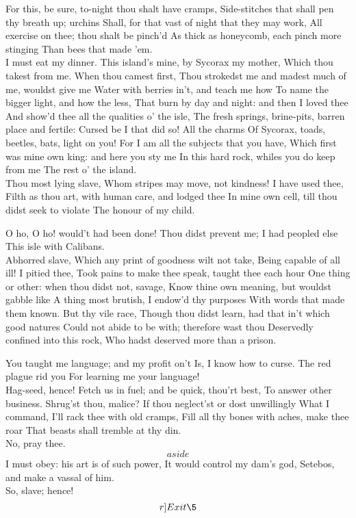 \documentclass[11pt]{book}
\begin{document}
\1	For this, be sure, to-night thou shalt have cramps,
	Side-stitches that shall pen thy breath up; urchins
	Shall, for that vast of night that they may work,
	All exercise on thee; thou shalt be pinch'd
	As thick as honeycomb, each pinch more stinging
	Than bees that made 'em. \\

\5	I must eat my dinner.
	This island's mine, by Sycorax my mother,
	Which thou takest from me. When thou camest first,
	Thou strokedst me and madest much of me, wouldst give me
	Water with berries in't, and teach me how
	To name the bigger light, and how the less,
	That burn by day and night: and then I loved thee
	And show'd thee all the qualities o' the isle,
	The fresh springs, brine-pits, barren place and fertile:
	Cursed be I that did so! All the charms
	Of Sycorax, toads, beetles, bats, light on you!
	For I am all the subjects that you have,
	Which first was mine own king: and here you sty me
	In this hard rock, whiles you do keep from me
	The rest o' the island. \\

\1	Thou most lying slave,
	Whom stripes may move, not kindness! I have used thee,
	Filth as thou art, with human care, and lodged thee
	In mine own cell, till thou didst seek to violate
	The honour of my child. 

\5	O ho, O ho! would't had been done!
	Thou didst prevent me; I had peopled else
	This isle with Calibans. \\

\1	Abhorred slave,
	Which any print of goodness wilt not take,
	Being capable of all ill! I pitied thee,
	Took pains to make thee speak, taught thee each hour
	One thing or other: when thou didst not, savage,
	Know thine own meaning, but wouldst gabble like
	A thing most brutish, I endow'd thy purposes
	With words that made them known. But thy vile race,
	Though thou didst learn, had that in't which good natures
	Could not abide to be with; therefore wast thou
	Deservedly confined into this rock,
	Who hadst deserved more than a prison.

\5	You taught me language; and my profit on't
	Is, I know how to curse. The red plague rid you
	For learning me your language! \\

\1	Hag-seed, hence!
	Fetch us in fuel; and be quick, thou'rt best,
	To answer other business. Shrug'st thou, malice?
	If thou neglect'st or dost unwillingly
	What I command, I'll rack thee with old cramps,
	Fill all thy bones with aches, make thee roar
	That beasts shall tremble at thy din. \\
\5	No, pray thee.
	\[aside\] I must obey: his art is of such power,
	It would control my dam's god, Setebos,  
	and make a vassal of him. \\
\1	So, slave; hence!  \[r]Exit \5\]
\end{document}
